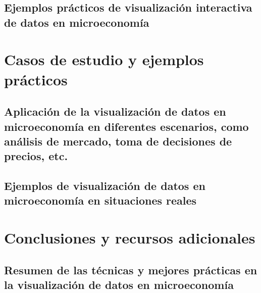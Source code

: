 \documentclass[
  a4paper,
]{article}
\begin{document}
\hypertarget{ejemplos-pruxe1cticos-de-visualizaciuxf3n-interactiva-de-datos-en-microeconomuxeda}{%
\subsection{Ejemplos prácticos de visualización interactiva de datos en
microeconomía}\label{ejemplos-pruxe1cticos-de-visualizaciuxf3n-interactiva-de-datos-en-microeconomuxeda}}

\hypertarget{casos-de-estudio-y-ejemplos-pruxe1cticos}{%
\section{Casos de estudio y ejemplos
prácticos}\label{casos-de-estudio-y-ejemplos-pruxe1cticos}}

\hypertarget{aplicaciuxf3n-de-la-visualizaciuxf3n-de-datos-en-microeconomuxeda-en-diferentes-escenarios-como-anuxe1lisis-de-mercado-toma-de-decisiones-de-precios-etc.}{%
\subsection{Aplicación de la visualización de datos en microeconomía en
diferentes escenarios, como análisis de mercado, toma de decisiones de
precios,
etc.}\label{aplicaciuxf3n-de-la-visualizaciuxf3n-de-datos-en-microeconomuxeda-en-diferentes-escenarios-como-anuxe1lisis-de-mercado-toma-de-decisiones-de-precios-etc.}}

\hypertarget{ejemplos-de-visualizaciuxf3n-de-datos-en-microeconomuxeda-en-situaciones-reales}{%
\subsection{Ejemplos de visualización de datos en microeconomía en
situaciones
reales}\label{ejemplos-de-visualizaciuxf3n-de-datos-en-microeconomuxeda-en-situaciones-reales}}

\hypertarget{conclusiones-y-recursos-adicionales}{%
\section{Conclusiones y recursos
adicionales}\label{conclusiones-y-recursos-adicionales}}

\hypertarget{resumen-de-las-tuxe9cnicas-y-mejores-pruxe1cticas-en-la-visualizaciuxf3n-de-datos-en-microeconomuxeda}{%
\subsection{Resumen de las técnicas y mejores prácticas en la
visualización de datos en
microeconomía}\label{resumen-de-las-tuxe9cnicas-y-mejores-pruxe1cticas-en-la-visualizaciuxf3n-de-datos-en-microeconomuxeda}}
\end{document}
